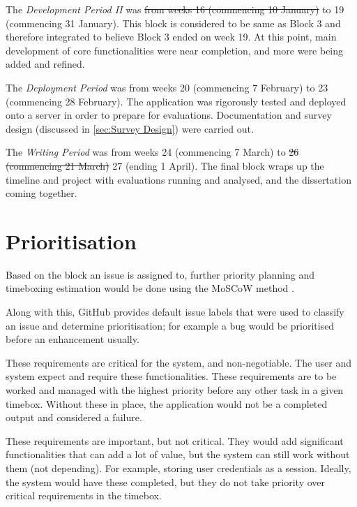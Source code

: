 \documentclass[../main.tex]{subfiles}
\begin{document}

The \textit{Development Period II} was \sout{from weeks 16 (commencing 10 January)} to 19 (commencing 31 January). This block is considered to be same as Block 3 and therefore integrated to believe Block 3 ended on week 19. At this point, main development of core functionalities were near completion, and more were being added and refined.


The \textit{Deployment Period} was from weeks 20 (commencing 7 February) to 23 (commencing 28 February). The application was rigorously tested and deployed onto a server in order to prepare for evaluations. Documentation and survey design (discussed in \ref{sec:Survey Design}) were carried out.


The \textit{Writing Period} was from weeks 24 (commencing 7 March) to \sout{26 (commencing 21 March)} 27 (ending 1 April). The final block wraps up the timeline and project with evaluations running and analysed, and the dissertation coming together.

\section{Prioritisation}

Based on the block an issue is assigned to, further priority planning and timeboxing estimation would be done using the MoSCoW method \cite{kuhn2009decrypting}.

Along with this, GitHub provides default issue labels \cite{ManagingLabels} that were used to classify an issue and determine prioritisation; for example a bug would be prioritised before an enhancement usually.


These requirements are critical for the system, and non-negotiable. The user and system expect and require these functionalities. These requirements are to be worked and managed with the highest priority before any other task in a given timebox. Without these in place, the application would not be a completed output and considered a failure.


These requirements are important, but not critical. They would add significant functionalities that can add a lot of value, but the system can still work without them (not depending). For example, storing user credentials as a session. Ideally, the system would have these completed, but they do not take priority over critical requirements in the timebox.
\end{document}
